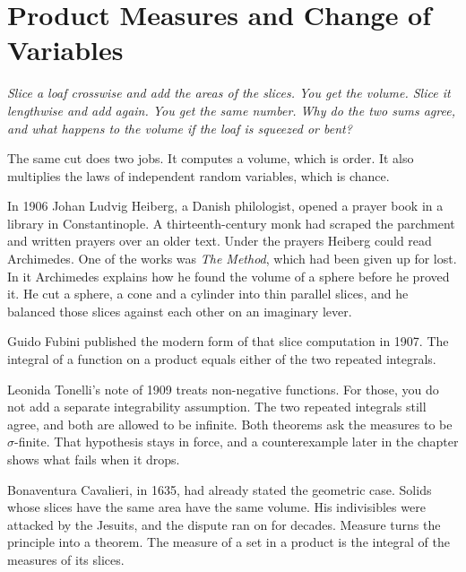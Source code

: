 \chapter{Product Measures and Change of Variables}\label{ch:products}

\begin{center}\itshape
Slice a loaf crosswise and add the areas of the slices. You get the volume. Slice it lengthwise and add again.
You get the same number. Why do the two sums agree, and what happens to the volume if the loaf is squeezed or bent?
\end{center}

The same cut does two jobs. It computes a volume, which is order. It also multiplies the laws of independent random variables, which is chance.

In 1906 Johan Ludvig Heiberg, a Danish philologist, opened a prayer book in a library in Constantinople. A thirteenth-century monk had scraped the parchment and written prayers over an older text. Under the prayers Heiberg could read Archimedes. One of the works was \emph{The Method}, which had been given up for lost. In it Archimedes explains how he found the volume of a sphere before he proved it. He cut a sphere, a cone and a cylinder into thin parallel slices, and he balanced those slices against each other on an imaginary lever.


Guido Fubini published the modern form of that slice computation in 1907. The integral of a function on a product equals either of the two repeated integrals.


Leonida Tonelli's note of 1909 treats non-negative functions. For those, you do not add a separate integrability assumption. The two repeated integrals still agree, and both are allowed to be infinite. Both theorems ask the measures to be $\sigma$-finite. That hypothesis stays in force, and a counterexample later in the chapter shows what fails when it drops.

Bonaventura Cavalieri, in 1635, had already stated the geometric case. Solids whose slices have the same area have the same volume. His indivisibles were attacked by the Jesuits, and the dispute ran on for decades. Measure turns the principle into a theorem. The measure of a set in a product is the integral of the measures of its slices.

